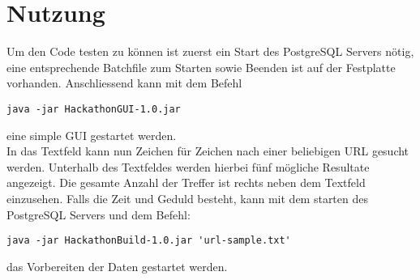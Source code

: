 \documentclass[11pt]{article} %
\begin{document}
\section{Nutzung}
Um den Code testen zu können ist zuerst ein Start des PostgreSQL Servers nötig, eine entsprechende Batchfile zum Starten sowie Beenden ist auf der Festplatte vorhanden. Anschliessend kann mit dem Befehl \begin{lstlisting}
java -jar HackathonGUI-1.0.jar
\end{lstlisting} eine simple GUI gestartet werden.\\
In das Textfeld kann nun Zeichen für Zeichen nach einer beliebigen URL gesucht werden. Unterhalb des Textfeldes werden hierbei fünf mögliche Resultate angezeigt. Die gesamte Anzahl der Treffer ist rechts neben dem Textfeld einzusehen.
Falls die Zeit und Geduld besteht, kann mit dem starten des PostgreSQL Servers und dem Befehl:
\begin{lstlisting}
java -jar HackathonBuild-1.0.jar 'url-sample.txt'
\end{lstlisting}
das Vorbereiten der Daten gestartet werden.
\end{document}
